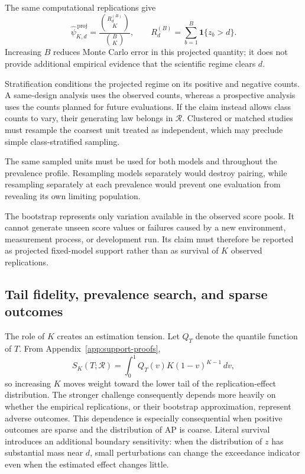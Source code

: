 \documentclass[11pt]{article}
\newcommand{\Regime}{\mathcal{R}}
\theoremstyle{remark}
\begin{document}
The same computational replications give
\begin{equation}
\widehat\psi_{K,d}^{\,\mathrm{proj}}
=
\frac{\binom{R_d^{(B)}}{K}}{\binom BK},
\qquad
R_d^{(B)}=\sum_{b=1}^B\mathbf 1\{z_b>d\}.
\label{eq:projected-literal-survival}
\end{equation}
Increasing $B$ reduces Monte Carlo error in this projected quantity; it does not provide additional empirical evidence that the scientific regime clears $d$.

Stratification conditions the projected regime on its positive and negative counts. A same-design analysis uses the observed counts, whereas a prospective analysis uses the counts planned for future evaluations. If the claim instead allows class counts to vary, their generating law belongs in $\Regime$. Clustered or matched studies must resample the coarsest unit treated as independent, which may preclude simple class-stratified sampling.

The same sampled units must be used for both models and throughout the prevalence profile. Resampling models separately would destroy pairing, while resampling separately at each prevalence would prevent one evaluation from revealing its own limiting population.

The bootstrap represents only variation available in the observed score pools. It cannot generate unseen score values or failures caused by a new environment, measurement process, or development run. Its claim must therefore be reported as projected fixed-model support rather than as survival of $K$ observed replications.

\subsection{Tail fidelity, prevalence search, and sparse outcomes}

The role of $K$ creates an estimation tension. Let $Q_T$ denote the quantile function of $T$. From Appendix~\ref{app:support-proofs},
\[
S_K(T;\Regime)
=
\int_0^1Q_T(v)K(1-v)^{K-1}\,dv,
\]
so increasing $K$ moves weight toward the lower tail of the replication-effect distribution. The stronger challenge consequently depends more heavily on whether the empirical replications, or their bootstrap approximation, represent adverse outcomes. This dependence is especially consequential when positive outcomes are sparse and the distribution of AP is coarse. Literal survival introduces an additional boundary sensitivity: when the distribution of $z$ has substantial mass near $d$, small perturbations can change the exceedance indicator even when the estimated effect changes little.
\end{document}
